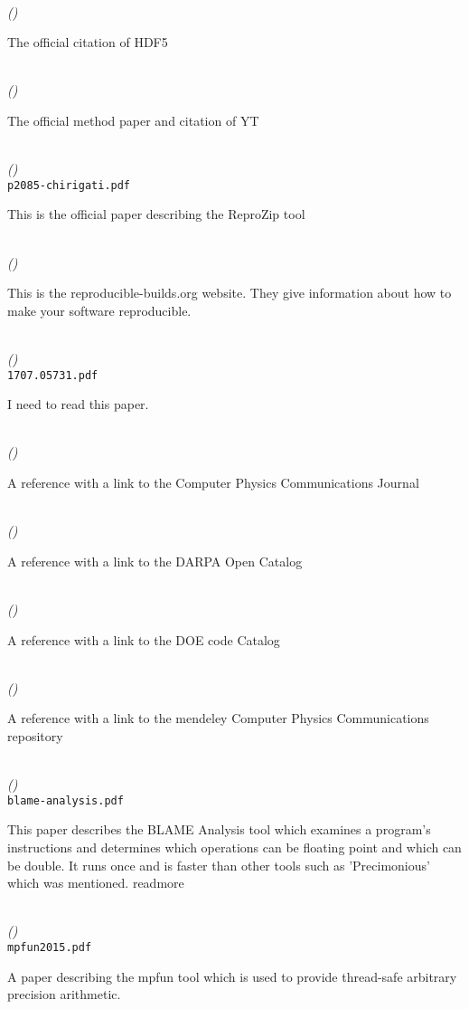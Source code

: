 \documentclass{article}
\newcommand{\readmore}{
	\gls{readmore}
}
\newenvironment{refdef}[2] {
	\noindent \textbf{\citetitle{#1}} \cite{#1}\\ \citejournalorbooktitle{#1} \textit{(\citeyear{#1})}\\ \texttt{#2} \vspace{0.2in} \par 
} {
\vspace{0.2in}
}
\begin{document}
\begin{refdef}{hdf5}{}
The official citation of HDF5
\end{refdef}

\begin{refdef}{yt}{}
The official method paper and citation of YT
\end{refdef}

\begin{refdef}{reprozip}{p2085-chirigati.pdf}
This is the official paper describing the ReproZip tool
\end{refdef}

\begin{refdef}{reproducible-builds}{}
This is the reproducible-builds.org website. They give information about how to make your software reproducible.
\end{refdef}

\begin{refdef}{sciunits}{1707.05731.pdf}
I need to read this paper.
\end{refdef}

\begin{refdef}{computer-physics-communications}{}
A reference with a link to the Computer Physics Communications Journal
\end{refdef}

\begin{refdef}{darpa-open-catalog}{}
A reference with a link to the DARPA Open Catalog
\end{refdef}

\begin{refdef}{doe-code}{}
A reference with a link to the DOE code Catalog
\end{refdef}

\begin{refdef}{elsevier-mendeley-computer-physics-communications}{}
A reference with a link to the mendeley Computer Physics Communications repository
\end{refdef}

\begin{refdef}{blame-analysis}{blame-analysis.pdf}
This paper describes the BLAME Analysis tool which examines a program's instructions and determines which operations can be floating point and which can be double. It runs once and is faster than other tools such as 'Precimonious' which was mentioned. \readmore
\end{refdef}

\begin{refdef}{mpfun}{mpfun2015.pdf}
A paper describing the mpfun tool which is used to provide thread-safe arbitrary precision arithmetic.
\end{refdef}
\end{document}
